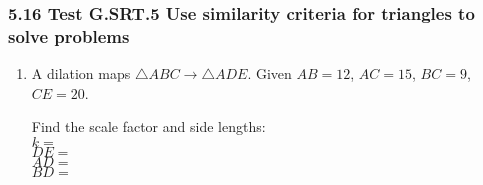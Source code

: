 \documentclass[12pt, twoside]{article}
\begin{document}
\subsubsection*{5.16 Test \hfill G.SRT.5 Use similarity criteria for triangles to solve problems}
\begin{enumerate}[itemsep=0.5cm]

\item A dilation maps $\triangle ABC \rightarrow \triangle ADE$. Given $AB=12$, $AC=15$, $BC=9$, $CE=20$. 
\begin{multicols}{2}
    Find the scale factor and side lengths:\\[0.5cm]
    $k=$\\[1cm]
    $DE=$\\[1cm]
    $AD=$\\[1cm]
    $BD=$\\
    \begin{flushright}
    \end{flushright}
\end{multicols}


\end{enumerate}
\end{document}
